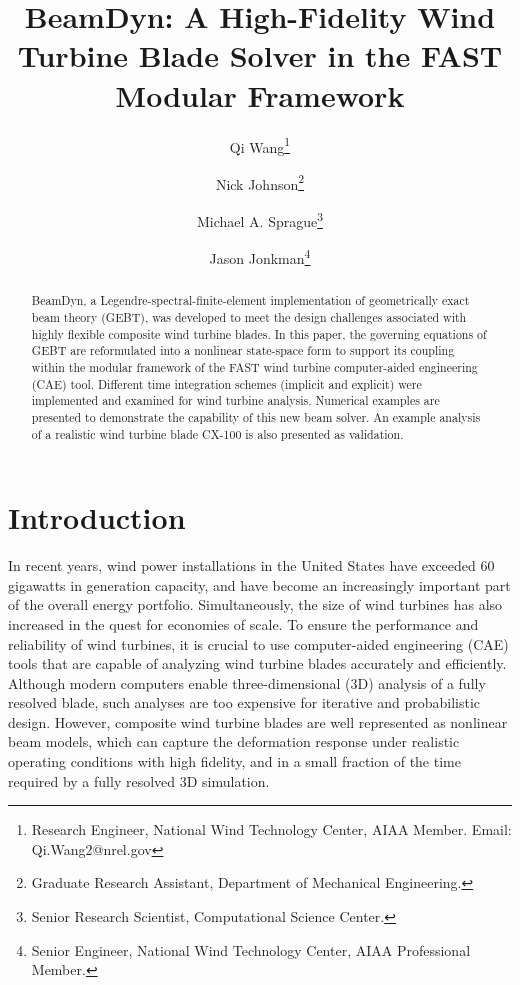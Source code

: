 \documentclass{aiaa-tc}
\title{BeamDyn: A High-Fidelity Wind Turbine Blade Solver in the FAST
Modular Framework}
\author[1]{Qi Wang\thanks{Research Engineer, National Wind Technology Center, AIAA Member. Email: Qi.Wang2@nrel.gov}}
\author[2]{Nick Johnson\thanks{Graduate Research Assistant, Department of
Mechanical Engineering.}}
\author[1]{Michael A. Sprague\thanks{Senior Research Scientist, 
Computational Science Center.}}
\author[1]{Jason Jonkman\thanks{Senior Engineer, National Wind Technology Center, AIAA Professional Member.}}
\affil[1]{National Renewable Energy Laboratory, Golden, CO 80401}
\affil[2]{Colorado School of Mines, Golden, CO 80401}
\begin{document}
\maketitle

\begin{abstract}
{BeamDyn, a Legendre-spectral-finite-element implementation of geometrically
exact beam theory (GEBT), was developed to meet the design challenges
associated with highly flexible composite wind turbine blades. In this
paper, the governing equations of GEBT are reformulated into a nonlinear
state-space form to support its coupling within the
modular framework of the FAST wind turbine
computer-aided engineering (CAE) tool. Different time integration
schemes (implicit and explicit) were implemented and examined for wind
turbine analysis.  Numerical examples are presented to demonstrate the capability of this new beam solver. An example analysis of a realistic wind turbine blade CX-100 is also presented as validation.}     
\end{abstract}

\section{Introduction} In recent years, wind power installations in the United States have exceeded 60
gigawatts in generation capacity, and have become an increasingly important part of the overall energy
portfolio. Simultaneously, the size of wind turbines has also increased in
the quest for economies of scale.   To ensure the performance and
reliability of wind turbines, it is crucial to use computer-aided engineering (CAE) tools that are capable of analyzing wind
turbine blades accurately and efficiently. Although modern
computers enable three-dimensional (3D) analysis
of a fully resolved blade, such analyses are too
expensive for iterative and probabilistic design. However, composite wind
turbine blades are well represented as nonlinear beam models, which can
capture the deformation response under realistic
operating conditions with high fidelity, and in a small fraction of the time required by a
fully resolved 3D simulation. 
\end{document}
